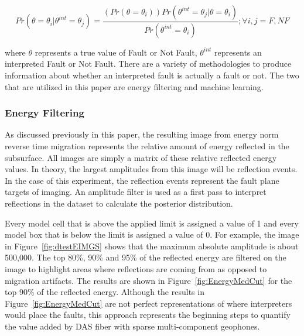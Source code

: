 \begin{equation}
  Pr(\theta=\theta_i | \theta^{int}=\theta_j)=\frac{(Pr(\theta=\theta_i)) Pr(\theta^{int}=\theta_j | \theta=\theta_i)}{Pr(\theta^{int}=\theta_i)}; \forall i,j={F, NF}
\label{eqn:Posterior}
\end{equation}

\noindent
where $\theta$ represents a true value of Fault or Not Fault, $\theta^{int}$ represents an interpreted Fault or Not Fault. There are a variety of methodologies to produce information about whether an interpreted fault is actually a fault or not. The two that are utilized in this paper are energy filtering and machine learning.

\subsubsection{Energy Filtering}
As discussed previously in this paper, the resulting image from energy norm reverse time migration represents the relative amount of energy reflected in the subsurface. All images are simply a matrix of these relative reflected energy values. In theory, the largest amplitudes from this image will be reflection events. In the case of this experiment, the reflection events represent the fault plane targets of imaging. An amplitude filter is used as a first pass to interpret reflections in the dataset to calculate the posterior distribution.

Every model cell that is above the applied limit is assigned a value of 1 and every model box that is below the limit is assigned a value of 0. For example, the image in Figure~\ref{fig:dtestEIMGS} shows that the maximum absolute amplitude is about 500,000. The top 80\%, 90\% and 95\% of the reflected energy are filtered on the image to highlight areas where reflections are coming from as opposed to migration artifacts. The results are shown in  Figure~\ref{fig:EnergyMedCut} for the top 90\% of the reflected energy. Although the results in Figure~\ref{fig:EnergyMedCut} are not perfect representations of where interpreters would place the faults, this approach represents the beginning steps to quantify the value added by DAS fiber with sparse multi-component geophones.


